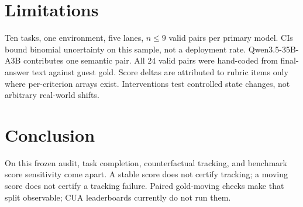 \documentclass{article}
\begin{document}
\section{Limitations}

Ten tasks, one environment, five lanes, $n\le 9$ valid pairs per primary model.
CIs bound binomial uncertainty on this sample, not a deployment rate.
Qwen3.5-35B-A3B contributes one semantic pair.
All $24$ valid pairs were hand-coded from final-answer text against guest gold.
Score deltas are attributed to rubric items only where per-criterion arrays exist.
Interventions test controlled state changes, not arbitrary real-world shifts.

\section{Conclusion}

On this frozen audit, task completion, counterfactual tracking, and benchmark score sensitivity come apart.
A stable score does not certify tracking; a moving score does not certify a tracking failure.
Paired gold-moving checks make that split observable; CUA leaderboards currently do not run them.




\newpage

\end{document}
